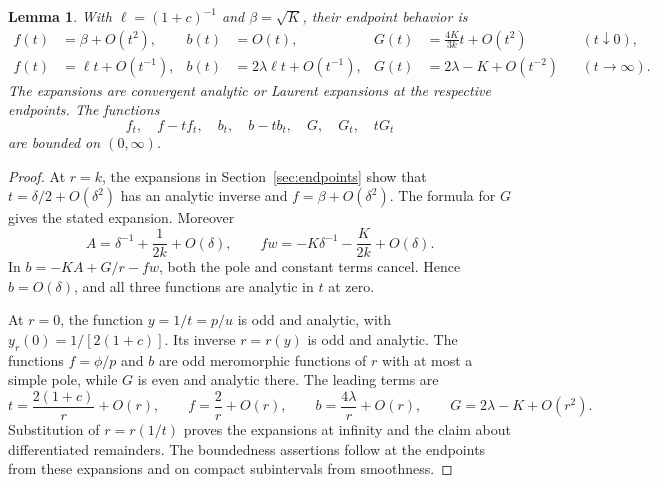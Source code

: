 \documentclass[11pt]{article}
\newtheorem{lemma}[theorem]{Lemma}
\theoremstyle{remark}
\begin{document}
\begin{lemma}\label{lem:flux-endpoints}
With
$\ell=(1+c)^{-1}$ and $\beta=\sqrt K$, their endpoint behavior is
\begin{align*}
 f(t)&=\beta+O(t^2),& b(t)&=O(t),&
 G(t)&=\frac{4K}{3k}t+O(t^2) &&(t\downarrow0),\\
 f(t)&=\ell t+O(t^{-1}),&
 b(t)&=2\lambda\ell t+O(t^{-1}),&
 G(t)&=2\lambda-K+O(t^{-2}) &&(t\to\infty).
\end{align*}
The expansions are convergent analytic or Laurent expansions at the
respective endpoints. The functions
\[
 f_t,\quad f-tf_t,\quad b_t,\quad b-tb_t,
 \quad G,\quad G_t,\quad tG_t
\]
are bounded on $(0,\infty)$.
\end{lemma}
\begin{proof}
At $r=k$, the expansions in Section~\ref{sec:endpoints} show that
$t=\delta/2+O(\delta^2)$ has an analytic inverse and
$f=\beta+O(\delta^2)$. The formula for $G$ gives the stated expansion.
Moreover
\[
 A=\delta^{-1}+\frac1{2k}+O(\delta),\qquad
 fw=-K\delta^{-1}-\frac K{2k}+O(\delta).
\]
In $b=-KA+G/r-fw$, both the pole and constant terms cancel. Hence
$b=O(\delta)$, and all three functions are analytic in $t$ at zero.

At $r=0$, the function $y=1/t=p/u$ is odd and analytic, with
$y_r(0)=1/[2(1+c)]$. Its inverse $r=r(y)$ is odd and analytic.
The functions $f=\phi/p$ and $b$ are odd meromorphic functions of $r$
with at most a simple pole, while $G$ is even and analytic there.
The leading terms are
\[
 t=\frac{2(1+c)}r+O(r),\qquad
 f=\frac2r+O(r),\qquad b=\frac{4\lambda}r+O(r),\qquad
 G=2\lambda-K+O(r^2).
\]
Substitution of $r=r(1/t)$ proves the expansions at infinity and the
claim about differentiated remainders. The boundedness assertions
follow at the endpoints from these expansions and on compact
subintervals from smoothness.
\end{proof}
\end{document}
